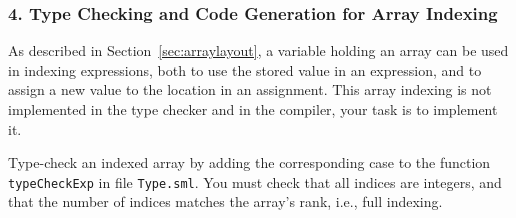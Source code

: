 \documentclass[12pt,a4paper]{article}
\newcommand{\comm}[2]{{\sf \(\spadesuit\){\bf #1: }{\rm \sf #2}\(\spadesuit\)}}
\begin{document}
{%


%
%
%
%

\subsubsection*{4. Type Checking and Code Generation for Array Indexing}

As described in Section~\ref{sec:arraylayout},
a variable holding an array can be used in indexing expressions, both to use
the stored value in an expression, and to assign a new value to the location in
an assignment.
%
%
This array indexing is not implemented in the type checker and in the compiler,
your task is to implement it.

Type-check an indexed array by adding the corresponding
            case to the function \texttt{typeCheckExp} in file \texttt{Type.sml}.
            You must check that all indices are integers,
            and that the number of indices matches the array's rank, i.e., full indexing.

}
\end{document}
